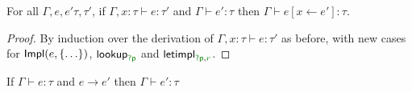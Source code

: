 \begin{lemma}
\label{thm:semantics-impl-pres-subst}
For all $\Gamma, e, e' \tau, \tau'$, if $\Gamma, x:\tau \vdash e : \tau'$ and $\Gamma \vdash e' : \tau$ 
then $\Gamma \vdash e[x \leftarrow e'] : \tau$.
\end{lemma}
\begin{proof}
  By induction over the derivation of $\Gamma, x:\tau \vdash e : \tau'$ as before, with new
  cases for $\textnormal{\sffamily Impl}(e, \{ \ldots \})$, $\ident{lookup}_{\cclrd{\ident{?p}}}$ and 
  $\ident{letimpl}_{\cclrd{\ident{?p}}, \cclrd{r}}$.
\end{proof}

\begin{theorem}
\label{thm:semantics-impl-pres}
  If $\Gamma \vdash e : \tau$ and $e \rightarrow e'$ then $\Gamma \vdash e' : \tau$
\end{theorem}
